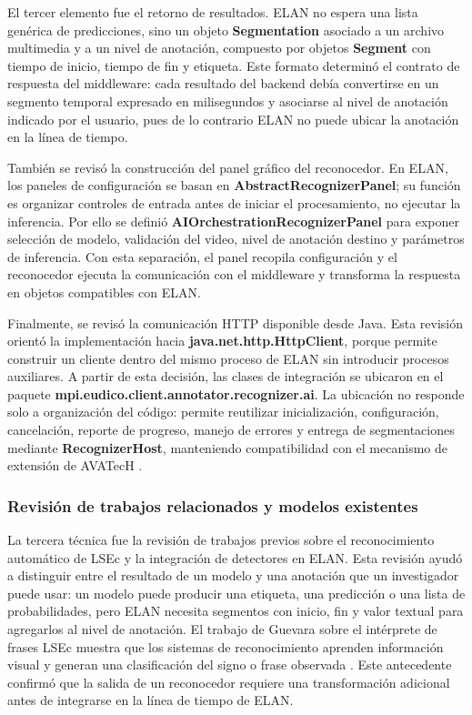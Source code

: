 El tercer elemento fue el retorno de resultados. ELAN no espera una lista genérica de predicciones, sino un objeto \textbf{Segmentation} asociado a un archivo multimedia y a un nivel de anotación, compuesto por objetos \textbf{Segment} con tiempo de inicio, tiempo de fin y etiqueta. Este formato determinó el contrato de respuesta del middleware: cada resultado del backend debía convertirse en un segmento temporal expresado en milisegundos y asociarse al nivel de anotación indicado por el usuario, pues de lo contrario ELAN no puede ubicar la anotación en la línea de tiempo.

También se revisó la construcción del panel gráfico del reconocedor. En ELAN, los paneles de configuración se basan en \textbf{AbstractRecognizerPanel}; su función es organizar controles de entrada antes de iniciar el procesamiento, no ejecutar la inferencia. Por ello se definió \textbf{AIOrchestrationRecognizerPanel} para exponer selección de modelo, validación del video, nivel de anotación destino y parámetros de inferencia. Con esta separación, el panel recopila configuración y el reconocedor ejecuta la comunicación con el middleware y transforma la respuesta en objetos compatibles con ELAN.

Finalmente, se revisó la comunicación HTTP disponible desde Java. Esta revisión orientó la implementación hacia \textbf{java.net.http.HttpClient}, porque permite construir un cliente dentro del mismo proceso de ELAN sin introducir procesos auxiliares. A partir de esta decisión, las clases de integración se ubicaron en el paquete \textbf{mpi.eudico.client.annotator.recognizer.ai}. La ubicación no responde solo a organización del código: permite reutilizar inicialización, configuración, cancelación, reporte de progreso, manejo de errores y entrega de segmentaciones mediante \textbf{RecognizerHost}, manteniendo compatibilidad con el mecanismo de extensión de AVATecH \cite{auer2014avatech}.

\subsubsection{Revisión de trabajos relacionados y modelos existentes}

La tercera técnica fue la revisión de trabajos previos sobre el reconocimiento automático de LSEc y la integración de detectores en ELAN. Esta revisión ayudó a distinguir entre el resultado de un modelo y una anotación que un investigador puede usar: un modelo puede producir una etiqueta, una predicción o una lista de probabilidades, pero ELAN necesita segmentos con inicio, fin y valor textual para agregarlos al nivel de anotación. El trabajo de Guevara sobre el intérprete de frases LSEc muestra que los sistemas de reconocimiento aprenden información visual y generan una clasificación del signo o frase observada \cite{guevara2022lsec_interprete}. Este antecedente confirmó que la salida de un reconocedor requiere una transformación adicional antes de integrarse en la línea de tiempo de ELAN.

